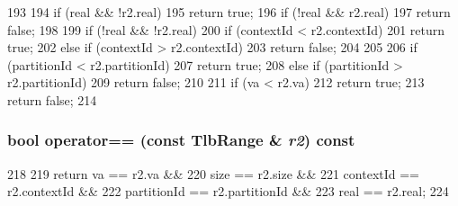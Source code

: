 \begin{DoxyCode}
193     {
194         if (real && !r2.real)
195             return true;
196         if (!real && r2.real)
197             return false;
198 
199         if (!real && !r2.real) {
200             if (contextId < r2.contextId)
201                 return true;
202             else if (contextId > r2.contextId)
203                 return false;
204         }
205 
206         if (partitionId < r2.partitionId)
207             return true;
208         else if (partitionId > r2.partitionId)
209             return false;
210 
211         if (va < r2.va)
212             return true;
213         return false;
214     }
\end{DoxyCode}
\hypertarget{structSparcISA_1_1TlbRange_a411f97b8c5e233b9856d4e5bc0d79902}{
\subsubsection[{operator==}]{\setlength{\rightskip}{0pt plus 5cm}bool operator== (const {\bf TlbRange} \& {\em r2}) const}}
\label{structSparcISA_1_1TlbRange_a411f97b8c5e233b9856d4e5bc0d79902}



\begin{DoxyCode}
218     {
219         return va == r2.va &&
220                size == r2.size &&
221                contextId == r2.contextId &&
222                partitionId == r2.partitionId &&
223                real == r2.real;
224     }
\end{DoxyCode}


